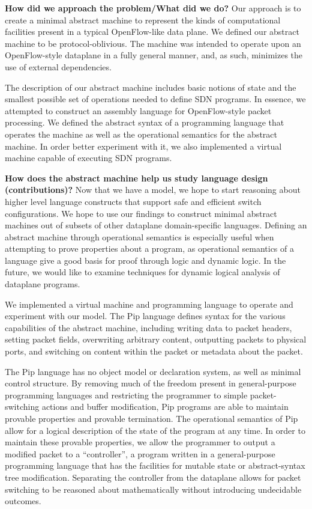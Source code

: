 \textbf{How did we approach the problem/What did we do?}
Our approach is to create a minimal abstract machine to represent the kinds of computational facilities present in a typical OpenFlow-like data plane. We defined our abstract machine to be protocol-oblivious. The machine was intended to operate upon an OpenFlow-style dataplane in a fully general manner, and, as such, minimizes the use of external dependencies.

The description of our abstract machine includes basic notions of state and the smallest possible set of operations needed to define SDN programs.
In essence, we attempted to construct an assembly language for OpenFlow-style packet processing. We defined the abstract syntax of a programming language that operates the machine as well as the operational semantics for the abstract machine. In order better experiment with it, we also implemented a virtual machine capable of executing SDN programs. 

\textbf{How does the abstract machine help us study language design (contributions)?}
Now that we have a model, we hope to start reasoning about higher level language constructs that support safe and efficient switch configurations. We hope to use our findings to construct minimal abstract machines out of subsets of other dataplane domain-specific languages. Defining an abstract machine through operational semantics is especially useful when attempting to prove properties about a program, as operational semantics of a language give a good basis for proof through logic and dynamic logic. In the future, we would like to examine techniques for dynamic logical analysis of dataplane programs.

We implemented a virtual machine and programming language to operate and experiment with our model. The Pip language defines syntax for the various capabilities of the abstract machine, including writing data to packet headers, setting packet fields, overwriting arbitrary content, outputting packets to physical ports, and switching on content within the packet or metadata about the packet. 

The Pip language has no object model or declaration system, as well as minimal control structure. By removing much of the freedom present in general-purpose programming languages and restricting the programmer to simple packet-switching actions and buffer modification, Pip programs are able to maintain provable properties and provable termination. The operational semantics of Pip allow for a logical description of the state of the program at any time. In order to maintain these provable properties, we allow the programmer to output a modified packet to a ``controller'', a program written in a general-purpose programming language that has the facilities for mutable state or abstract-syntax tree modification. Separating the controller from the dataplane allows for packet switching to be reasoned about mathematically without introducing undecidable outcomes.

